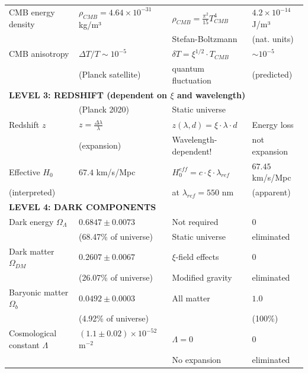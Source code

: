 \documentclass[12pt,a4paper]{report}
\begin{document}
\begin{longtable}{p{4.0cm}p{3.2cm}p{2.8cm}p{2.8cm}}
	CMB energy density & $\rho_{CMB} = 4.64 \times 10^{-31}$ kg/m³ & $\rho_{CMB} = \frac{\pi^2}{15} T_{CMB}^4$ & $4.2 \times 10^{-14}$ J/m³ \\
	& & Stefan-Boltzmann & (nat. units) \\[0.3em]
	
	CMB anisotropy & $\Delta T/T \sim 10^{-5}$ & $\delta T = \xi^{1/2} \cdot T_{CMB}$ & $\sim 10^{-5}$ \\
	& (Planck satellite) & quantum fluctuation & (predicted) \\[0.3em]
	
	\midrule
	\multicolumn{4}{l}{\textbf{LEVEL 3: REDSHIFT (dependent on $\xi$ and wavelength)}} \\
	\midrule
	
	& (Planck 2020) & Static universe & \\[0.3em]
	
	Redshift $z$ & $z = \frac{\Delta\lambda}{\lambda}$ & $z(\lambda, d) = \xi \cdot \lambda \cdot d$ & Energy loss \\
	& (expansion) & Wavelength-dependent! & not expansion \\[0.3em]
	
	Effective $H_0$ & $67.4$ km/s/Mpc & $H_0^{eff} = c \cdot \xi \cdot \lambda_{ref}$ & $67.45$ km/s/Mpc \\
	(interpreted) & & at $\lambda_{ref} = 550$ nm & (apparent) \\[0.3em]
	
	\midrule
	\multicolumn{4}{l}{\textbf{LEVEL 4: DARK COMPONENTS}} \\
	\midrule
	
	Dark energy $\Omega_\Lambda$ & $0.6847 \pm 0.0073$ & Not required & $0$ \\
	& (68.47\% of universe) & Static universe & eliminated \\[0.3em]
	
	Dark matter $\Omega_{DM}$ & $0.2607 \pm 0.0067$ & $\xi$-field effects & $0$ \\
	& (26.07\% of universe) & Modified gravity & eliminated \\[0.3em]
	
	Baryonic matter $\Omega_b$ & $0.0492 \pm 0.0003$ & All matter & $1.0$ \\
	& (4.92\% of universe) & & (100\%) \\[0.3em]
	
	Cosmological constant $\Lambda$ & $(1.1 \pm 0.02) \times 10^{-52}$ m$^{-2}$ & $\Lambda = 0$ & $0$ \\
	& & No expansion & eliminated \\[0.3em]
	

\end{longtable}
\end{document}
